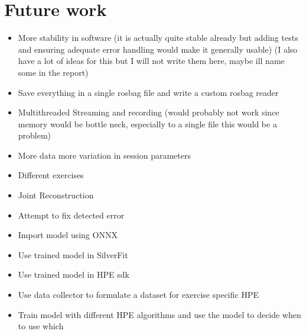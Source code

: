 \section{Future work}
\label{sec:future_work}

\begin{itemize}
  \item More stability in software (it is actually quite stable already but adding tests and ensuring adequate error handling would make it generally usable) (I also have a lot of ideas for this but I will not write them here, maybe ill name some in the report)
  \item Save everything in a single rosbag file and write a custom rosbag reader
  \item Multithreaded Streaming and recording (would probably not work since memory would be bottle neck, especially to a single file this would be a problem)
  \item More data more variation in session parameters
  \item Different exercises
  \item Joint Reconstruction
  \item Attempt to fix detected error
  \item Import model using ONNX \cite{ONNX}
  \item Use trained model in SilverFit
  \item Use trained model in HPE sdk
  \item Use data collector to formulate a dataset for exercise specific HPE
  \item Train model with different HPE algorithms and use the model to decide when to use which
\end{itemize}